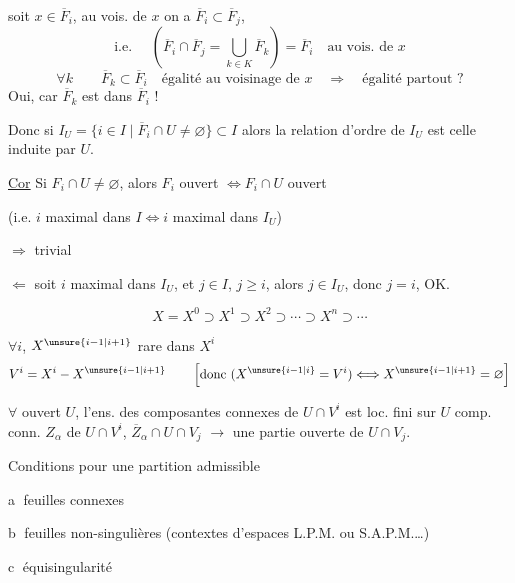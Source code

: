  soit $x\in\overline F_i$, au vois. de $x$ on a $\overline F_i\subset\overline F_j$,
\[
\text{i.e. }\quad
\left(\overline F_i\cap\overline F_j=\bigcup_{k\in K}\overline F_k\right)=\overline F_i
\quad\text{au vois. de }x
\]
\[
\forall k\qquad \overline F_k\subset\overline F_i
\quad\text{égalité au voisinage de }x
\quad\Longrightarrow\quad\text{égalité partout ?}
\]
Oui, car $\overline F_k$ est \uline{} dans $\overline F_i$ !

Donc si $I_U=\{i\in I\mid\overline F_i\cap U\neq\varnothing\}\subset I$
alors la relation d'ordre de $I_U$ est celle induite par $U$.

\uline{Cor} Si $F_i\cap U\neq\varnothing$, alors $F_i$ ouvert $\Longleftrightarrow F_i\cap U$ ouvert

(i.e. $i$ maximal dans $I\Longleftrightarrow i$ maximal dans $I_U$)


$\Rightarrow$ trivial

$\Leftarrow$ soit $i$ maximal dans $I_U$, et $j\in I$, $j\geq i$, alors $j\in I_U$, donc $j=i$, OK.

\[
X=X^0\supset X^1\supset X^2\supset\cdots\supset X^n\supset\cdots
\]

$\forall i$,  $X^{\unsure{i-1|i+1}}$ rare dans $X^i$
\[
V^i=X^i-X^{\unsure{i-1|i+1}}
\qquad
\left[\text{donc }(X^{\unsure{i-1|i}}=V^i)\Longleftrightarrow X^{\unsure{i-1|i+1}}=\varnothing\right]
\]

$\forall$ ouvert $U$, l'ens. des composantes connexes de $U\cap V^i$ est loc. fini sur $U$
 \deleted{$\unsure{\forall}$} comp. conn. $Z_\alpha$ de $U\cap V^i$,
 $\overline Z_\alpha\cap U\cap V_j$
$\longrightarrow$ une partie ouverte de $U\cap V_j$.


Conditions pour une partition admissible

\textcircled{a} feuilles connexes

\textcircled{b} feuilles non-singulières (contextes d'espaces  L.P.M. ou S.A.P.M.\ldots)

\textcircled{c} équisingularité

